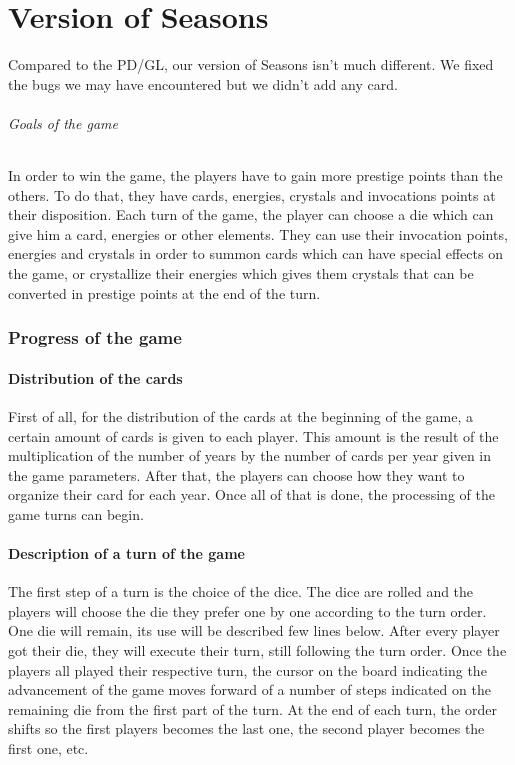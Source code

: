 

\part{Version of Seasons}
    
    Compared to the PD/GL, our version of Seasons isn't much different. 
    We fixed the bugs we may have encountered but we didn't add any card. 

    \paragraph{Goals of the game}
    
        In order to win the game, the players have to gain more prestige points than the others.
        To do that, they have cards, energies, crystals and invocations points at their disposition.
        Each turn of the game, the player can choose a die which can give him a card, energies or other elements. They can use their invocation points, energies and crystals in order to summon cards which can have special effects on the game, or crystallize their energies which gives them crystals that can be converted in prestige points at the end of the turn.

    \section{Progress of the game}
    
        \subsection{Distribution of the cards}
            First of all, for the distribution of the cards at the beginning of the game, a certain amount of cards is given to each player. This amount is the result of the multiplication of the number of years by the number of cards per year given in the game parameters. After that, the players can choose how they want to organize their card for each year.
            Once all of that is done, the processing of the game turns can begin.
        
        \subsection{Description of a turn of the game}
            The first step of a turn is the choice of the dice. The dice are rolled and the players will choose the die they prefer one by one according to the turn order. One die will remain, its use will be described few lines below.
            After every player got their die, they will execute their turn, still following the turn order.
            Once the players all played their respective turn, the cursor on the board indicating the advancement of the game moves forward of a number of steps indicated on the remaining die from the first part of the turn.
            At the end of each turn, the order shifts so the first players becomes the last one, the second player becomes the first one, etc.
        
